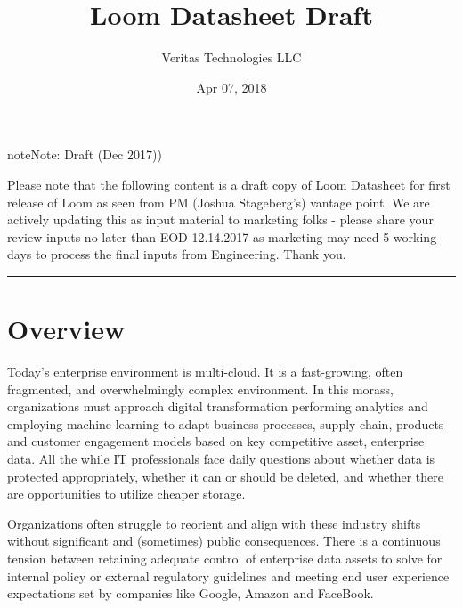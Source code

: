 \documentclass[letterpaper,10pt,english]{sphinxhowto}
\title{Loom Datasheet Draft}
\date{Apr 07, 2018}
\author{Veritas Technologies LLC}
\begin{document}
\maketitle
\sphinxtableofcontents
{}\label{\detokenize{col/ds/mcdmp_ds_opt3::doc}}


\begin{sphinxadmonition}{note}{Note:}
Draft (Dec 2017))
\end{sphinxadmonition}

Please note that the following content is a draft copy of Loom Datasheet for first release of Loom  as seen from PM (Joshua Stageberg’s) vantage point. We are actively updating this as input material to marketing folks - please share your review inputs no later than EOD 12.14.2017 as marketing may need 5 working days to process the final inputs from Engineering. Thank you.


\bigskip\hrule\bigskip


\begin{figure}[htbp]
\centering

\noindent{}
\end{figure}


\section{Overview}
\label{\detokenize{col/ds/mcdmp_ds_opt3:overview}}\label{\detokenize{col/ds/mcdmp_ds_opt3:loom-datasheet-dec-2017}}\label{\detokenize{col/ds/mcdmp_ds_opt3:mcdmp-ds-opt3}}
Today’s enterprise environment is multi-cloud. It is a fast-growing, often fragmented, and overwhelmingly complex environment. In this morass, organizations must approach digital transformation \textendash{} performing analytics and employing machine learning to adapt business processes, supply chain, products and customer engagement models based on key competitive asset, enterprise data. All the while IT professionals face daily questions about whether data is protected appropriately, whether it can or should be deleted, and whether there are opportunities to utilize cheaper storage.

Organizations often struggle to reorient and align with these industry shifts without significant and (sometimes) public consequences. There is a continuous tension between retaining adequate control of enterprise data assets to solve for internal policy or external regulatory guidelines and meeting end user experience expectations set by companies like Google, Amazon and FaceBook.
\end{document}
